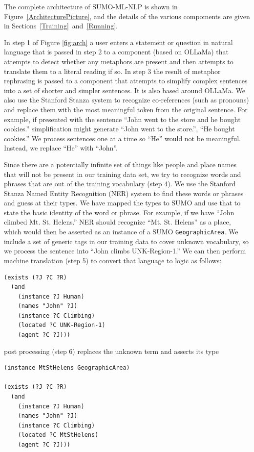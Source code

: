 \documentclass[runningheads]{llncs}
\begin{document}
The complete architecture of SUMO-ML-NLP is shown in Figure~\ref{ArchitecturePicture}, and the
details of the various compoments are given in Sections~\ref{Training}~and~\ref{Running}.

In step 1 of Figure \ref{fig:arch} a user enters a statement or question in natural language that is passed in step 2 to a component (based on OLLaMa) that attempts to detect whether any metaphors are present and then attempts to translate them to a literal reading if so.
In step 3 the result of metaphor rephrasing is passed to a component that attempts to simplify complex sentences into a set of shorter and simpler sentences.  It is also based around OLLaMa.  We also use the Stanford Stanza system to recognize co-references (such as pronouns) and replace them with the most meaningful token from the original sentence.  For example, if presented with the sentence ``John went to the store and he bought cookies.'' simplification might generate ``John went to the store.'', ``He bought cookies.''  We process sentences one at a time so ``He'' would not be meaningful.  Instead, we replace ``He'' with ``John''.

Since there are a potentially infinite set of things like people and place names that will not be present in our training data set, we try to recognize words and phrases that are out of the training vocabulary (step 4).  We use the Stanford Stanza Named Entity Recognition (NER) system to find these words or phrases and guess at their types.  We have mapped the types to SUMO and use that to state the basic identity of the word or phrase.  For example, if we have ``John climbed Mt. St. Helens.'' NER should recognize ``Mt. St. Helens'' as a place, which would then be asserted as an instance of a SUMO \texttt{GeographicArea}.  We include a set of generic tags in our training data to cover unknown vocabulary, so we process the sentence into ``John climbs UNK-Region-1.''  We can then perform machine translation (step 5) to convert that language to logic as follows:

\begin{verbatim}
(exists (?J ?C ?R)
  (and
    (instance ?J Human)
    (names "John" ?J)
    (instance ?C Climbing)
    (located ?C UNK-Region-1)
    (agent ?C ?J)))
\end{verbatim}

post processing (step 6) replaces the unknown term and asserts its type

\begin{verbatim}
(instance MtStHelens GeographicArea)

(exists (?J ?C ?R)
  (and
    (instance ?J Human)
    (names "John" ?J)
    (instance ?C Climbing)
    (located ?C MtStHelens)
    (agent ?C ?J)))
\end{verbatim}
\end{document}
